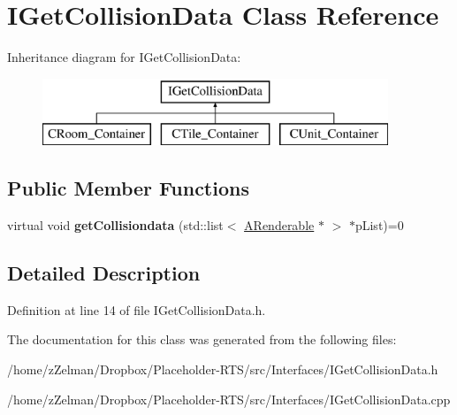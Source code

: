 \hypertarget{classIGetCollisionData}{\section{I\-Get\-Collision\-Data Class Reference}
\label{classIGetCollisionData}
}
Inheritance diagram for I\-Get\-Collision\-Data\-:\begin{figure}[H]
\begin{center}
\leavevmode
\includegraphics[height=2.000000cm]{classIGetCollisionData}
\end{center}
\end{figure}
\subsection*{Public Member Functions}
\begin{DoxyCompactItemize}
\item 
\hypertarget{classIGetCollisionData_ad31b95dda265659e5090fc2c188b30b9}{virtual void {\bfseries get\-Collisiondata} (std\-::list$<$ \hyperlink{classARenderable}{A\-Renderable} $\ast$ $>$ $\ast$p\-List)=0}\label{classIGetCollisionData_ad31b95dda265659e5090fc2c188b30b9}

\end{DoxyCompactItemize}


\subsection{Detailed Description}


Definition at line 14 of file I\-Get\-Collision\-Data.\-h.



The documentation for this class was generated from the following files\-:\begin{DoxyCompactItemize}
\item 
/home/z\-Zelman/\-Dropbox/\-Placeholder-\/\-R\-T\-S/src/\-Interfaces/I\-Get\-Collision\-Data.\-h\item 
/home/z\-Zelman/\-Dropbox/\-Placeholder-\/\-R\-T\-S/src/\-Interfaces/I\-Get\-Collision\-Data.\-cpp\end{DoxyCompactItemize}
